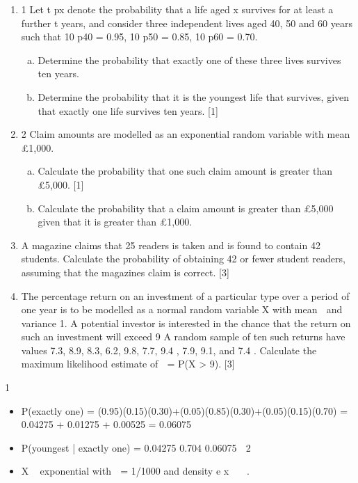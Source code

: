 \documentclass[a4paper,12pt]{article}
\begin{document}
\begin{enumerate}
\begin{enumerate}
\item 1 Let t px denote the probability that a life aged x survives for at least a further t years,
and consider three independent lives aged 40, 50 and 60 years such that
10 p40 = 0.95, 10 p50 = 0.85, 10 p60 = 0.70.
\begin{enumerate}[(a)]
\item Determine the probability that exactly one of these three lives survives ten
years. 
\item Determine the probability that it is the youngest life that survives, given that
exactly one life survives ten years. [1]
\end{enumerate}
\item 2 Claim amounts are modelled as an exponential random variable with mean £1,000.
\begin{enumerate}[(a)]
\item Calculate the probability that one such claim amount is greater than £5,000.
[1]
\item Calculate the probability that a claim amount is greater than £5,000 given that
it is greater than £1,000. 
\end{enumerate}
\item  A magazine claims that 25%
readers is taken and is found to contain 42 students.
Calculate the probability of obtaining 42 or fewer student readers, assuming that the magazines claim is correct. [3]
\item  The percentage return on an investment of a particular type over a period of one year is to be modelled as a normal random variable X with mean  and variance 1. A
potential investor is interested in the chance that the return on such an investment will
exceed 9%
A random sample of ten such returns have values
7.3, 8.9, 8.3, 6.2, 9.8, 7.7, 9.4 , 7.9, 9.1, and 7.4 .
Calculate the maximum likelihood estimate of  = P(X > 9). [3]
\end{enumerate}
1 
\begin{itemize} \item P(exactly one) = (0.95)(0.15)(0.30)+(0.05)(0.85)(0.30)+(0.05)(0.15)(0.70)
= 0.04275 + 0.01275 + 0.00525 = 0.06075
\item P(youngest | exactly one) = 0.04275 0.704
0.06075 
2 \item X ~ exponential with  = 1/1000 and density e x 
 .


\end{itemize}
\end{enumerate}
\end{document}
